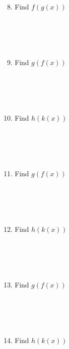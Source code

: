\documentclass{article}
\begin{document}
\begin{minipage}[t]{0.45\textwidth}
    \begin{enumerate}
        \setcounter{enumi}{7} %
        \item Find $f(g(x))$
        \\\\\\\\\\
        \item Find $g(f(x))$
        \\\\\\\\\\
        \item Find $h(k(x))$
        \\\\\\\\\\
        \item Find $g(f(x))$
        \\\\\\\\\\
        \item Find $h(k(x))$
        \\\\\\\\\\
        \item Find $g(f(x))$
        \\\\\\\\\\
        \item Find $h(k(x))$
    \end{enumerate}
\end{minipage}

\noindent
\vspace{2cm}
\\
\end{document}

